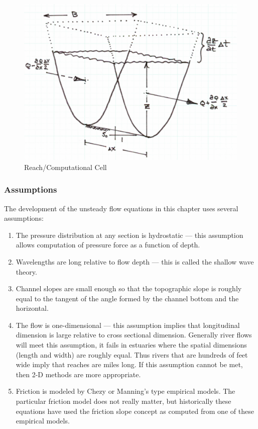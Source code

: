 \begin{figure}[h!] %
   \centering
   \includegraphics[width=5in]{./12-OpenChannelFlow/reach_sketch.jpg} 
   \caption{Reach/Computational Cell}
   \label{fig:reach_sketch}
\end{figure}

\subsubsection{Assumptions}
The development of the unsteady flow equations in this chapter uses several assumptions:
\begin{enumerate}
\item The pressure distribution at any section is hydrostatic --- this assumption allows computation of pressure force as a function of depth.
\item Wavelengths are long relative to flow depth --- this is called the shallow wave theory.
\item Channel slopes are small enough so that the topographic slope is roughly equal to the tangent of the angle formed by the channel bottom and the horizontal. 
\item The flow is one-dimensional --- this assumption implies that longitudinal dimension is large relative to cross sectional dimension.  Generally river flows will meet this assumption, it fails in estuaries where the spatial dimensions (length and width) are roughly equal.  Thus rivers that are hundreds of feet wide imply that reaches are miles long.  If this assumption cannot be met, then 2-D methods are more appropriate.
\item Friction is modeled by Chezy or Manning's type empirical models.  The particular friction model does not really matter, but historically these equations have used the friction slope concept as computed from one of these empirical models.
\end{enumerate}


